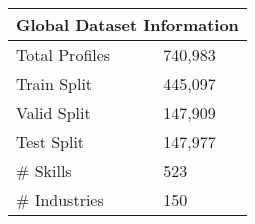 \begin{center}
    \begin{table}[ht]
    \centering
    \begin{tabular}{@{}ll@{}}
    \multicolumn{2}{c}{Global Dataset Information} \\ \hline
    Total Profiles       & 740,983                 \\
    Train Split          & 445,097       \\
    Valid Split          & 147,909       \\
    Test Split           & 147,977   \\ \# Skills               & 523                     \\
    \# Industries            & 150                    
    \end{tabular}
    \end{table}\label{tab:geninfo}
\end{center}